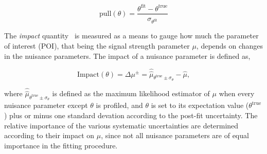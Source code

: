 \begin{equation}
  \textrm{pull}(\theta) = \frac{\theta^{\textrm{fit}}-\theta^{\textrm{true}}}{\sigma_{\theta^{\textrm{fit}}}}
  \label{eq:pulls}
\end{equation}

The \textit{impact} quantity~\cite{CYRSP303} is measured as a means to gauge how much the parameter of interest (POI), that being the signal strength parameter $\mu$, depends on changes in the nuisance parameters. The impact of a nuisance parameter is defined as,

\begin{equation}
  \textrm{Impact}(\theta) = \Delta\mu^{\pm} = \hat{\hat{\mu}}_{\theta^{\textrm{true}}\pm\sigma_{\theta}} - \hat{\mu},
  \label{eq:impact}
\end{equation}

where $\hat{\hat{\mu}}_{\theta^{\textrm{true}}\pm\sigma_{\theta}}$ is defined as the maximum likelihood estimator of $\mu$ when every nuisance parameter except $\theta$ is profiled, and $\theta$ is set to its expectation value ($\theta^{\textrm{true}}$) plus or minus one standard devation according to the post-fit uncertainty. The relative importance of the various systematic uncertainties are determined according to their impact on $\mu$, since not all nuisance parameters are of equal importance in the fitting procedure.

